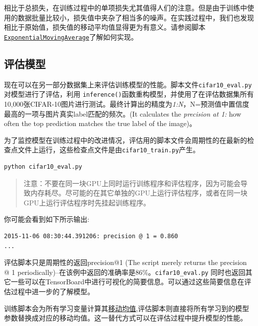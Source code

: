 相比于总损失，在训练过程中的单项损失尤其值得人们的注意。但是由于训练中使用的数据批量比较小，损失值中夹杂了相当多的噪声。在实践过程中，我们也发现相比于原始值，损失值的移动平均值显得更为有意义。请参阅脚本\href{https://github.com/jikexueyuanwiki/tensorflow-zh/blob/master/SOURCE/api_docs/python/train.md\#ExponentialMovingAverage}{\texttt{ExponentialMovingAverage}}了解如何实现。

\hypertarget{ux8bc4ux4f30ux6a21ux578b}{\subsection{评估模型
}\label{ux8bc4ux4f30ux6a21ux578b}}

现在可以在另一部分数据集上来评估训练模型的性能。脚本文件\texttt{cifar10\_eval.py}对模型进行了评估，利用
\texttt{inference()}函数重构模型，并使用了在评估数据集所有10,000张CIFAR-10图片进行测试。最终计算出的精度为\emph{1:N}，N=预测值中置信度最高的一项与图片真实label匹配的频次。(It
calculates the \emph{precision at 1:} how often the top prediction
matches the true label of the image)。

为了监控模型在训练过程中的改进情况，评估用的脚本文件会周期性的在最新的检查点文件上运行，这些检查点文件是由\texttt{cifar10\_train.py}产生。

\begin{verbatim}
python cifar10_eval.py
\end{verbatim}

\begin{quote}
注意：不要在同一块GPU上同时运行训练程序和评估程序，因为可能会导致内存耗尽。尽可能的在其它单独的GPU上运行评估程序，或者在同一块GPU上运行评估程序时先挂起训练程序。
\end{quote}

你可能会看到如下所示输出:

\begin{verbatim}
2015-11-06 08:30:44.391206: precision @ 1 = 0.860
...
\end{verbatim}

评估脚本只是周期性的返回precision@1 (The script merely returns the
precision @ 1
periodically)--在该例中返回的准确率是86\%。\texttt{cifar10\_eval.py}
同时也返回其它一些可以在TensorBoard中进行可视化的简要信息。可以通过这些简要信息在评估过程中进一步的了解模型。

训练脚本会为所有学习变量计算其\href{https://github.com/jikexueyuanwiki/tensorflow-zh/blob/master/SOURCE/api_docs/python/train.md\#ExponentialMovingAverage}{移动均值},评估脚本则直接将所有学习到的模型参数替换成对应的移动均值。这一替代方式可以在评估过程中提升模型的性能。

